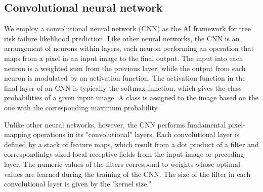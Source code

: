\documentclass[Journal,letterpaper, SingleSpace, InsideFigs]{ascelike-new}
\begin{document}
\subsection{Convolutional neural network}
We employ a convolutional neural network (CNN) as the AI framework for tree risk failure likelihood prediction.
Like other neural networks, the CNN is an arrangement of neurons within layers, each neuron performing an operation that maps from a pixel in an input image to the final output. 
The input into each neuron is a weighted sum from the previous layer, while the output from each neuron is modulated by an activation function.
The activation function in the final layer of an CNN is typically the softmax function, which gives the class probabilities of a given input image. 
A class is assigned to the image based on the one with the corresponding maximum probability.

Unlike other neural networks, however, the CNN performs fundamental pixel-mapping operations in its "convolutional" layers. Each convolutional layer is defined by a stack of feature maps, which result from a dot product of a filter and correspondinlgy-sized local receptive fields from the input image or preceding layer. 
The numeric values of the filters correspond to weights whose optimal values are learned during the training of the CNN.
The size of the filter in each convolutional layer is given by the "kernel size."
\end{document}
